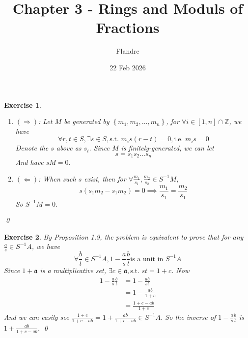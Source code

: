 \documentclass{article}
\title{Chapter 3 - Rings and Moduls of Fractions}
\author{Flandre}
\date{22 Feb 2026}
\theoremstyle{breakstyle}
\newtheorem{exercise}{Exercise}
\begin{document}
\maketitle

\begin{exercise}
    \leavevmode \vspace{-\baselineskip}
    \begin{enumerate}[label=({\roman*})]
        \item $(\Rightarrow)$:
            Let $M$ be generated by $\left\{ m_1,m_2,\ldots ,m_{n} \right\} $,
            for $\forall i\in [1,n]\cap \mathbb{Z}$, we have
            $$
            \forall r,t\in S,\exists s \in S,\text{s.t. }m_{i}s(r-t)=0,\text{i.e. }m_{i}s=0
            $$
            Denote the $s$ above as $s_{i}$.
            Since $M$ is finitely-generated, we can let
            $$
            s=s_1s_2\ldots s_n
            $$
            And have $sM=0$.
        \item $(\Leftarrow)$:
            When such $s$ exist,
            then for $\forall \frac{m_1}{s_1},\frac{m_2}{s_2}\in S^{-1}M$,
            $$
            s(s_1m_2-s_1m_2)=0\implies \frac{m_1}{s_1}=\frac{m_2}{s_1}
            $$
            So $S^{-1}M=0$.
    \end{enumerate}
    \qed
\end{exercise}

\begin{exercise}
    By \emph{Proposition 1.9},
    the problem is equivalent to prove that for any $\frac{a}{s}\in S^{-1}A$, we have
    $$
    \forall \frac{b}{t}\in S^{-1}A,1-\frac{a}{s}\frac{b}{t}\text{is a unit in }S^{-1}A
    $$
    Since $1+\mathfrak{a}$ is a multiplicative set, $\exists c\in \mathfrak{a},\text{s.t. }st=1+c$.
    Now
    \begin{align*}
        1-\frac{a}{s}\frac{b}{t}&= 1-\frac{ab}{st} \\
        &= 1-\frac{ab}{1+c} \\
        &= \frac{1+c-ab}{1+c}
    \end{align*}
    And we can easily see $\frac{1+c}{1+c-ab}=1+\frac{ab}{1+c-ab}\in S^{-1}A$.
    So the inverse of $1-\frac{a}{s}\frac{b}{t}$ is $1+\frac{ab}{1+c-ab}$.
    \qed
\end{exercise}
\end{document}

